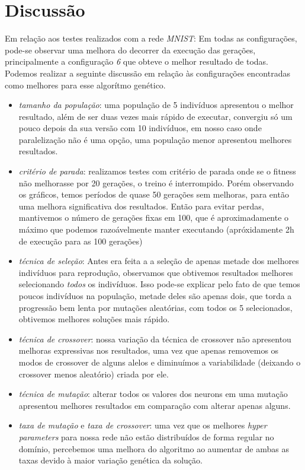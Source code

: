 \documentclass[twoside,conference,a4paper]{IEEEtran}
\begin{document}
\section{Discussão}
Em relação aos testes realizados com a rede \emph{MNIST}:
Em todas as configurações, pode-se observar uma melhora do decorrer da execução das gerações, principalmente a configuração \emph{6} que obteve o melhor resultado de todas.
Podemos realizar a seguinte discussão em relação às configurações encontradas como melhores para esse algorítmo genético.

\begin{itemize}
    \item \emph{tamanho da população}: uma população de 5 indivíduos apresentou o melhor resultado, além de ser duas vezes mais rápido de executar, convergiu só um pouco depois da sua versão com 10 indivíduos, em nosso caso onde paralelização não é uma opção, uma população menor apresentou melhores resultados.
    \item \emph{critério de parada}: realizamos testes com critério de parada onde se o fitness não melhorasse por 20 gerações, o treino é interrompido. Porém observando os gráficos, temos períodos de quase 50 gerações sem melhoras, para então uma melhora significativa dos resultados. Então para evitar perdas, mantivemos o número de gerações fixas em 100, que é aproximadamente o máximo que podemos razoávelmente manter executando (apróxidamente 2h de execução para as 100 gerações)
    \item \emph{técnica de seleção}: Antes era feita a a seleção de apenas metade dos melhores indivíduos para reprodução, observamos que obtivemos resultados melhores selecionando \emph{todos} os indivíduos. Isso pode-se explicar pelo fato de que temos poucos indivíduos na população, metade deles são apenas dois, que torda a progressão bem lenta por mutações aleatórias, com todos os 5 selecionados, obtivemos melhores soluções mais rápido.
    \item \emph{técnica de crossover}: nossa variação da técnica de crossover não apresentou melhoras expressivas nos resultados, uma vez que apenas removemos os modos de crossover de alguns alelos e diminuímos a variabilidade (deixando o crossover menos aleatório) criada por ele.
    \item \emph{técnica de mutação}: alterar todos os valores dos neurons em uma mutação apresentou melhores resultados em comparação com alterar apenas alguns.
    \item \emph{taxa de mutação} e \emph{taxa de crossover}: uma vez que os melhores \emph{hyper parameters} para nossa rede não estão distribuídos de forma regular no domínio, percebemos uma melhora do algoritmo ao aumentar de ambas as taxas devido à maior variação genética da solução.
\end{itemize}
\end{document}
